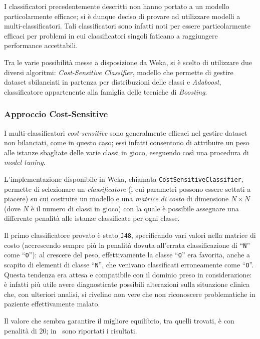 I classificatori precedentemente descritti non hanno portato a un modello particolarmente efficace;
si è dunque deciso di provare ad utilizzare modelli a multi-classificatori.
Tali classificatori sono infatti noti per essere particolarmente efficaci per problemi in cui classificatori singoli faticano a raggiungere performance accettabili.

Tra le varie possibilità messe a disposizione da Weka, si è scelto di utilizzare due diversi algoritmi:
\emph{Cost-Sensitive Classifier}, modello che permette di gestire dataset sbilanciati in partenza per distribuzioni delle classi e \emph{Adaboost}, classificatore appartenente alla famiglia delle tecniche di \emph{Boosting}.

\subsubsection{Approccio Cost-Sensitive}

I multi-classificatori \emph{cost-sensitive} sono generalmente efficaci nel gestire dataset non bilanciati, come in questo caso;
essi infatti consentono di attribuire un peso alle istanze sbagliate delle varie classi in gioco, eseguendo così una procedura di \emph{model tuning}.

L'implementazione disponibile in Weka, chiamata \texttt{CostSensitiveClassifier},
permette di selezionare un \emph{classificatore} (i cui parametri possono essere settati a piacere) su cui costruire un modello
e una \emph{matrice di costo} di dimensione \(N×N\) (dove \(N\) è il numero di classi in gioco) con la quale è possibile assegnare una differente penalità alle istanze classificate per ogni classe.

Il primo classificatore provato è stato \texttt{J48}, specificando vari valori nella matrice di costo (accrescendo sempre più la penalità dovuta all'errata classificazione di ``\texttt{N}'' come ``\texttt{O}''):
al crescere del peso, effettivamente la classe ``\texttt{O}'' era favorita, anche a scapito di elementi di classe ``\texttt{N}'', che venivano classificati erroneamente come ``\texttt{O}''.
Questa tendenza era attesa e compatibile con il dominio preso in considerazione:
è infatti più utile avere diagnosticate possibili alterazioni sulla situazione clinica che, con ulteriori analisi, si rivelino non vere che non riconoscere problematiche in paziente effettivamente malato.

Il valore che sembra garantire il migliore equilibrio, tra quelli trovati, è con penalità di \(20\);
in~ sono riportati i risultati.

